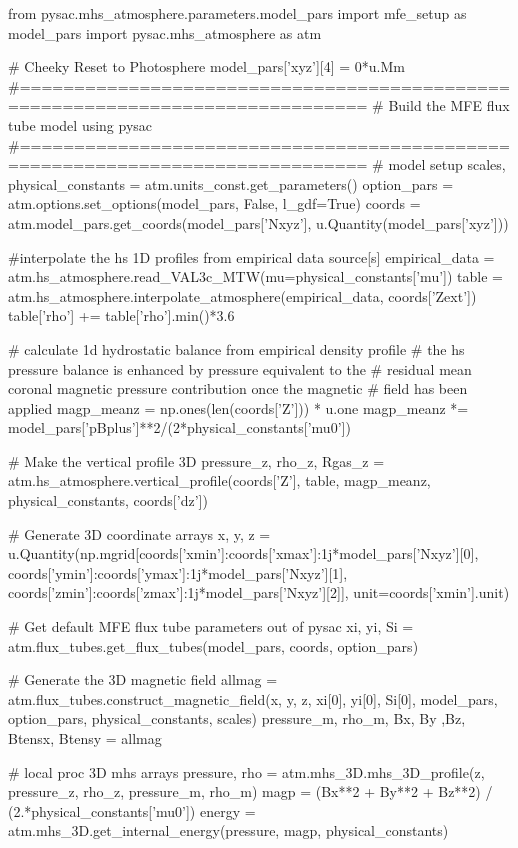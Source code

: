 \begin{pycode}[chapter3]
from pysac.mhs_atmosphere.parameters.model_pars import mfe_setup as model_pars
import pysac.mhs_atmosphere as atm

# Cheeky Reset to Photosphere
model_pars['xyz'][4] = 0*u.Mm
#==============================================================================
# Build the MFE flux tube model using pysac
#==============================================================================
# model setup
scales, physical_constants = atm.units_const.get_parameters()
option_pars = atm.options.set_options(model_pars, False, l_gdf=True)
coords = atm.model_pars.get_coords(model_pars['Nxyz'], u.Quantity(model_pars['xyz']))

#interpolate the hs 1D profiles from empirical data source[s]
empirical_data = atm.hs_atmosphere.read_VAL3c_MTW(mu=physical_constants['mu'])
table = atm.hs_atmosphere.interpolate_atmosphere(empirical_data, coords['Zext'])
table['rho'] += table['rho'].min()*3.6

# calculate 1d hydrostatic balance from empirical density profile
# the hs pressure balance is enhanced by pressure equivalent to the
# residual mean coronal magnetic pressure contribution once the magnetic
# field has been applied
magp_meanz = np.ones(len(coords['Z'])) * u.one
magp_meanz *= model_pars['pBplus']**2/(2*physical_constants['mu0'])

# Make the vertical profile 3D
pressure_z, rho_z, Rgas_z = atm.hs_atmosphere.vertical_profile(coords['Z'], table, magp_meanz, physical_constants, coords['dz'])

# Generate 3D coordinate arrays
x, y, z = u.Quantity(np.mgrid[coords['xmin']:coords['xmax']:1j*model_pars['Nxyz'][0],
                              coords['ymin']:coords['ymax']:1j*model_pars['Nxyz'][1],
                              coords['zmin']:coords['zmax']:1j*model_pars['Nxyz'][2]], unit=coords['xmin'].unit)

# Get default MFE flux tube parameters out of pysac
xi, yi, Si = atm.flux_tubes.get_flux_tubes(model_pars, coords, option_pars)

# Generate the 3D magnetic field
allmag = atm.flux_tubes.construct_magnetic_field(x, y, z, xi[0], yi[0], Si[0], model_pars, option_pars, physical_constants, scales)
pressure_m, rho_m, Bx, By ,Bz, Btensx, Btensy = allmag

# local proc 3D mhs arrays
pressure, rho = atm.mhs_3D.mhs_3D_profile(z, pressure_z, rho_z, pressure_m, rho_m)
magp = (Bx**2 + By**2 + Bz**2) / (2.*physical_constants['mu0'])
energy = atm.mhs_3D.get_internal_energy(pressure, magp, physical_constants)
\end{pycode}

